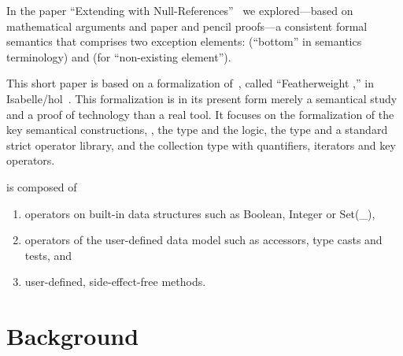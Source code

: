 In the paper ``Extending \OCL with
Null-References''~\cite{brucker.ea:ocl-null:2009} we explored---based
on mathematical arguments and paper and pencil proofs---a consistent
formal semantics that comprises two exception elements:
 (``bottom'' in semantics terminology) and
 (for ``non-existing element'').

This short paper is based on a formalization
of~\cite{brucker.ea:ocl-null:2009}, called ``Featherweight \OCL,'' in
Isabelle/\acs{hol}~\cite{nipkow.ea:isabelle:2002}.  This formalization
is in its present form merely a semantical study and a proof of
technology than a real tool. It focuses on the formalization of the
key semantical constructions, \ie, the type  and
the logic, the type  and a standard strict operator
library, and the collection type  with quantifiers,
iterators and key operators.


 \OCL is composed of
 \begin{enumerate}
 \item operators on built-in data structures such as Boolean, Integer or Set(\_),
 \item operators of the user-defined data model such as accessors,
   type casts and tests, and
 \item user-defined, side-effect-free methods.
 \end{enumerate}




\chapter{Background}


